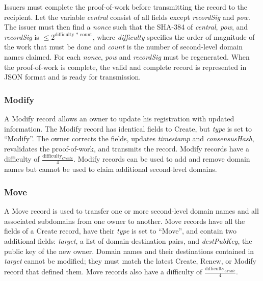 Issuers must complete the proof-of-work before transmitting the record to the recipient. Let the variable \emph{central} consist of all fields except \emph{recordSig} and \emph{pow}. The issuer must then find a \emph{nonce} such that the SHA-384 of \emph{central}, \emph{pow}, and \emph{recordSig} is $ \leq 2^\textrm{difficulty * count} $, where \emph{difficulty} specifies the order of magnitude of the work that must be done and \emph{count} is the number of second-level domain names claimed. For each \emph{nonce}, \emph{pow} and \emph{recordSig} must be regenerated. When the proof-of-work is complete, the valid and complete record is represented in JSON format and is ready for transmission.


\subsubsection{Modify}

A Modify record allows an owner to update his registration with updated information. The Modify record has identical fields to Create, but \emph{type} is set to ``Modify''. The owner corrects the fields, updates \emph{timestamp} and \emph{consensusHash}, revalidates the proof-of-work, and transmits the record. Modify records have a difficulty of $ \frac{\textrm{difficulty}_{Create}}{4} $. Modify records can be used to add and remove domain names but cannot be used to claim additional second-level domains.

\subsubsection{Move}


A Move record is used to transfer one or more second-level domain names and all associated subdomains from one owner to another. Move records have all the fields of a Create record, have their \emph{type} is set to ``Move'', and contain two additional fields: \emph{target}, a list of domain-destination pairs, and \emph{destPubKey}, the public key of the new owner. Domain names and their destinations contained in \emph{target} cannot be modified; they must match the latest Create, Renew, or Modify record that defined them. Move records also have a difficulty of $ \frac{\textrm{difficulty}_{Create}}{4} $.

